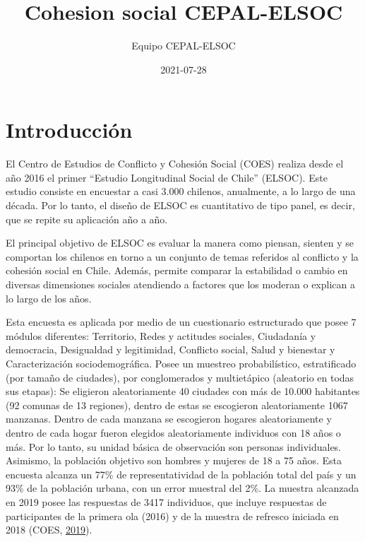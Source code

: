 \documentclass[
  12pt,
]{book}
\title{Cohesion social CEPAL-ELSOC}
\author{Equipo CEPAL-ELSOC}
\date{2021-07-28}
\begin{document}
\maketitle

{
\hypersetup{linkcolor=}
\setcounter{tocdepth}{1}
\tableofcontents
}
\listoftables
\listoffigures
{}
\hypertarget{introducciuxf3n}{%
\chapter{Introducción}\label{introducciuxf3n}}

El Centro de Estudios de Conflicto y Cohesión Social (COES) realiza desde el año 2016 el primer ``Estudio Longitudinal Social de Chile'' (ELSOC). Este estudio consiste en encuestar a casi 3.000 chilenos, anualmente, a lo largo de una década. Por lo tanto, el diseño de ELSOC es cuantitativo de tipo panel, es decir, que se repite su aplicación año a año.

El principal objetivo de ELSOC es evaluar la manera como piensan, sienten y se comportan los chilenos en torno a un conjunto de temas referidos al conflicto y la cohesión social en Chile. Además, permite comparar la estabilidad o cambio en diversas dimensiones sociales atendiendo a factores que los moderan o explican a lo largo de los años.

Esta encuesta es aplicada por medio de un cuestionario estructurado que posee 7 módulos diferentes: Territorio, Redes y actitudes sociales, Ciudadanía y democracia, Desigualdad y legitimidad, Conflicto social, Salud y bienestar y Caracterización sociodemográfica. Posee un muestreo probabilístico, estratificado (por tamaño de ciudades), por conglomerados y multietápico (aleatorio en todas sus etapas): Se eligieron aleatoriamente 40 ciudades con más de 10.000 habitantes (92 comunas de 13 regiones), dentro de estas se escogieron aleatoriamente 1067 manzanas. Dentro de cada manzana se escogieron hogares aleatoriamente y dentro de cada hogar fueron elegidos aleatoriamente individuos con 18 años o más. Por lo tanto, su unidad básica de observación son personas individuales. Asimismo, la población objetivo son hombres y mujeres de 18 a 75 años. Esta encuesta alcanza un 77\% de representatividad de la población total del país y un 93\% de la población urbana, con un error muestral del 2\%. La muestra alcanzada en 2019 posee las respuestas de 3417 individuos, que incluye respuestas de participantes de la primera ola (2016) y de la muestra de refresco iniciada en 2018 (COES, \protect\hyperlink{ref-coes_Radiografia_2019}{2019}).
\end{document}
